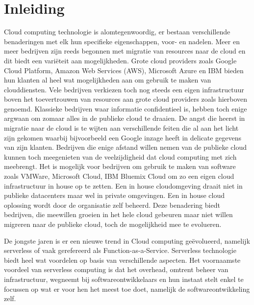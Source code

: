 \chapter{Inleiding}
\label{ch:inleiding}

Cloud computing technologie is alomtegenwoordig, er bestaan verschillende benaderingen met elk hun specifieke eigenschappen, voor- en nadelen. Meer en meer bedrijven zijn reeds begonnen met migratie van resources naar de cloud en dit biedt een variëteit aan mogelijkheden. Grote cloud providers zoals Google Cloud Platform, Amazon Web Services (AWS), Microsoft Azure en IBM bieden hun klanten al heel wat mogelijkheden aan om gebruik te maken van clouddiensten. Vele bedrijven verkiezen toch nog steeds een eigen infrastructuur boven het toevertrouwen van resources aan grote cloud providers zoals hierboven genoemd. Klassieke bedrijven waar informatie confidentieel is, hebben toch enige argwaan om zomaar alles in de publieke cloud te draaien. De angst die heerst in migratie naar de cloud is te wijten aan verschillende feiten die al aan het licht zijn gekomen waarbij bijvoorbeeld een Google inzage heeft in delicate gegevens van zijn klanten. Bedrijven die enige afstand willen nemen van de publieke cloud kunnen toch meegenieten van de veelzijdigheid dat cloud computing met zich meebrengt. Het is mogelijk voor bedrijven om gebruik te maken van software zoals VMWare, Microsoft Cloud, IBM Bluemix Cloud om zo een eigen cloud infrastructuur in house op te zetten. Een in house cloudomgeving draait niet in publieke datacenters maar wel in private omgevingen. Een in house cloud oplossing wordt door de organisatie zelf beheerd. Deze benadering biedt bedrijven, die meewillen groeien in het hele cloud gebeuren maar niet willen migreren naar de publieke cloud, toch de mogelijkheid mee te evolueren.

De jongste jaren is er een nieuwe trend in Cloud computing geëvolueerd, namelijk serverless of vaak gerefereerd als Function-as-a-Service. Serverless technologie biedt heel wat voordelen op basis van verschillende aspecten. Het voornaamste voordeel van serverless computing is dat het overhead, omtrent beheer van infrastructuur, wegneemt bij softwareontwikkelaars en hun instaat stelt enkel te focussen op wat er voor hen het meest toe doet, namelijk de softwareontwikkeling zelf.

